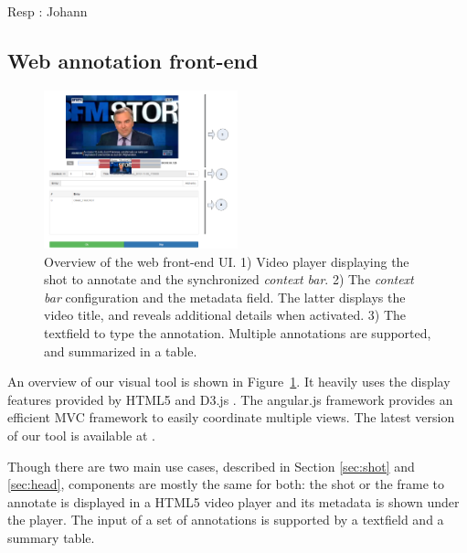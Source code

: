 \documentclass[a4paper]{article}
\begin{document}
Resp : Johann
  
      \subsection{Web annotation front-end}

\begin{figure}[h]
 	\includegraphics[width=0.5\textwidth]{camomile_ui.png}
	\caption{Overview of the web front-end UI. 1) Video player displaying the shot to annotate and the synchronized \emph{context bar}. 2) The \emph{context bar} configuration and the metadata field. The latter displays the video title, and reveals additional details when activated. 3) The textfield to type the annotation. Multiple annotations are supported, and summarized in a table.}
	\label{fig:frontend}

\end{figure}


An overview of our visual tool is shown in Figure~\ref{fig:frontend}. It heavily uses the display features provided by HTML5 and D3.js \cite{d3js}. The angular.js framework \cite{angularjs} provides an efficient MVC framework to easily coordinate multiple views. The latest version of our tool is available at \cite{urlfrontend}.



Though there are two main use cases, described in Section \ref{sec:shot} and \ref{sec:head}, components are mostly the same for both: the shot or the frame to annotate is displayed in a HTML5 video player and its metadata is shown under the player. The input of a set of annotations is supported by a textfield and a summary table.\\
\end{document}
